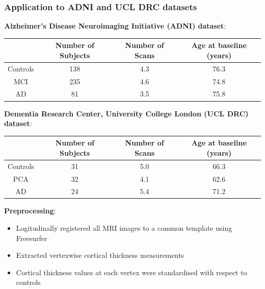 \documentclass[8pt,xcolor=table]{beamer}
\begin{document}
\begin{frame}
\frametitle{Application to ADNI and UCL DRC datasets}

\vspace{1em}
\textbf{Alzheimer's Disease Neuroimaging Initiative (ADNI) dataset}:

\begin{table}
\centering
\begin{tabular}{ c |c | c | c} 
& Number of Subjects & Number of Scans & Age at baseline (years)\\
\hline
Controls & 138 & 4.3 & 76.3\\ 
MCI & 235 & 4.6 & 74.8\\ 
AD & 81 & 3.5 & 75.8\\ 
\end{tabular}
\label{tab:adni_demographics}
\end{table}

\vspace{1em}

\textbf{Dementia Research Center, University College London (UCL DRC) dataset}:

\begin{table}
\centering
\begin{tabular}{ c |c | c | c } 
& Number of Subjects & Number of Scans & Age at baseline (years)\\
\hline
Controls & 31 & 5.0 & 66.3\\ 
PCA & 32 & 4.1 & 62.6\\ 
AD & 24 & 5.4 & 71.2\\ 
\end{tabular}
\label{tab:drc_demographics}
\end{table}

\vspace{1em}

\textbf{Preprocessing}:
\begin{itemize}
 \item Logitudinally registered all MRI images to a common template using Freesurfer
 \item Extracted vertexwise cortical thickness measurements
 \item Cortical thickness values at each vertex were standardised with respect to controls
\end{itemize}

\end{frame}
\end{document}
